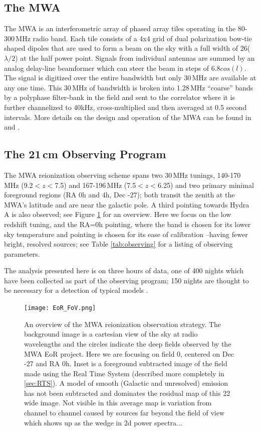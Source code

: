 \documentclass[twolcolumn]{emulateapj}
\begin{document}
\subsection{The MWA}
The MWA is an interferometric array of phased array tiles operating in the 80-300\,MHz radio band. Each tile consists of a 4x4 grid of dual polarization bow-tie shaped dipoles that are used to form a beam on the sky with a full width of 26\arcdeg($\lambda/2$) at the half power point. Signals from individual antennas are summed by an analog delay-line beamformer which can steer the beam in steps of 6.8\arcdeg$cos(l)$.  The signal is digitized over the entire bandwidth but only 30\,MHz are available at any one time.  This 30\,MHz of bandwidth is broken into 1.28\,MHz ``coarse'' bands by a polyphase filter-bank in the field and sent to the correlator \citep{Ord:2015PASA...32....6O} where it is further channelized to 40kHz, cross-multiplied and then averaged at 0.5 second intervals.  More details on the design and operation of the MWA can be found in \cite{Lonsdale:2009p7913} and \cite{Tingay:2013p9022}.


\subsection{The 21\,cm Observing Program}
The MWA reionization observing scheme spans two 30\,MHz tunings, 140-170\,MHz (9.2$<z<$7.5) and 167-196\,MHz (7.5$<z<$6.25) and two primary minimal foreground regions (RA 0h and 4h, Dec -27\arcdeg); both transit the zenith at the MWA's  latitude and are near the galactic pole. A third pointing towards Hydra A is also observed; see Figure \ref{fig:fields} for an overview. Here we focus on the low redshift tuning, and the RA=0h pointing, where the band is chosen for its lower sky temperature and pointing is chosen for its ease of calibration --having fewer bright, resolved sources; see Table \ref{tab:observing} for a listing of observing parameters.

The analysis presented here is on three hours of data, one of 400 nights which have been collected as part of the observing program; 150 nights are thought to be necessary for a detection of typical models \citep{Beardsley:2013p9952}.

\begin{figure}[htbp]
\begin{center}
\texttt{[image: EoR\_FoV.png]}
\caption{An overview of the MWA reionization observation strategy. The background image is a cartesian view of the sky at radio wavelengths and the circles indicate the deep fields observed by the MWA EoR project.  Here we are focusing on field 0, centered on Dec -27\arcdeg{} and RA 0h. Inset is a foreground subtracted image of the field made using the Real Time System (described more completely in \ref{sec:RTS}). A model of smooth (Galactic and unresolved) emission has not been subtracted and dominates the residual map of this 22\arcdeg{} wide image. Not visible in this average map is variation from channel to channel caused by sources far beyond the field of view which shows up as the wedge in 2d power spectra...	}
\label{fig:fields}
\end{center}
\end{figure}
\end{document}
